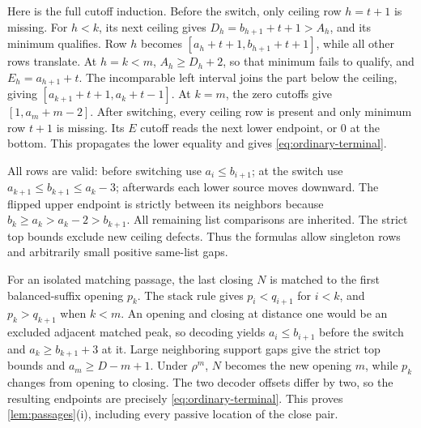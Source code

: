 Here is the full cutoff induction. Before the switch, only ceiling row $h=t+1$ is missing. For $h<k$, its next ceiling gives $D_h=b_{h+1}+t+1>A_h$, and its minimum qualifies. Row $h$ becomes $[a_h+t+1,b_{h+1}+t+1]$, while all other rows translate. At $h=k<m$, $A_h\ge D_h+2$, so that minimum fails to qualify, and $E_h=a_{h+1}+t$. The incomparable left interval joins the part below the ceiling, giving $[a_{k+1}+t+1,a_k+t-1]$. At $k=m$, the zero cutoffs give $[1,a_m+m-2]$. After switching, every ceiling row is present and only minimum row $t+1$ is missing. Its $E$ cutoff reads the next lower endpoint, or $0$ at the bottom. This propagates the lower equality and gives \eqref{eq:ordinary-terminal}.

All rows are valid: before switching use $a_i\le b_{i+1}$; at the switch use $a_{k+1}\le b_{k+1}\le a_k-3$; afterwards each lower source moves downward. The flipped upper endpoint is strictly between its neighbors because $b_k\ge a_k>a_k-2>b_{k+1}$. All remaining list comparisons are inherited. The strict top bounds exclude new ceiling defects. Thus the formulas allow singleton rows and arbitrarily small positive same-list gaps.

For an isolated matching passage, the last closing $N$ is matched to the first balanced-suffix opening $p_k$. The stack rule gives $p_i<q_{i+1}$ for $i<k$, and $p_k>q_{k+1}$ when $k<m$. An opening and closing at distance one would be an excluded adjacent matched peak, so decoding yields $a_i\le b_{i+1}$ before the switch and $a_k\ge b_{k+1}+3$ at it. Large neighboring support gaps give the strict top bounds and $a_m\ge D-m+1$. Under $\rho^m$, $N$ becomes the new opening $m$, while $p_k$ changes from opening to closing. The two decoder offsets differ by two, so the resulting endpoints are precisely \eqref{eq:ordinary-terminal}. This proves \cref{lem:passages}(i), including every passive location of the close pair.

